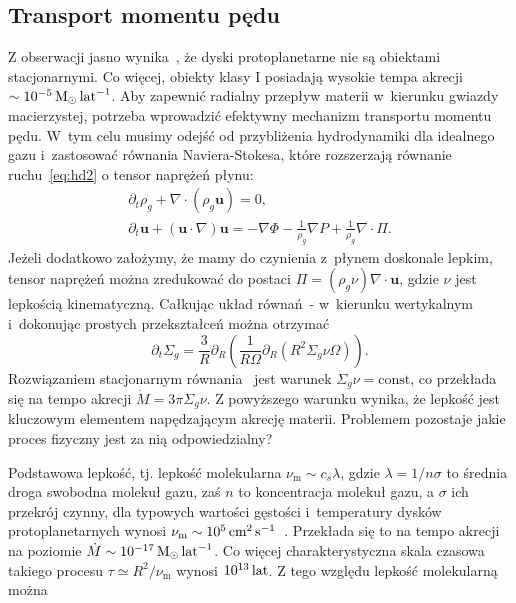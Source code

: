 \subsection{Transport momentu pędu}
Z obserwacji jasno wynika~\citep{MME04}, że dyski
protoplanetarne nie są obiektami stacjonarnymi. Co więcej, obiekty klasy I
posiadają wysokie tempa akrecji $\sim 10^{-5}\hbox{$\mathrm{\thinspace M_{\odot}}$}\hbox{$\thinspace\textrm{lat}$}^{-1}$. Aby zapewnić
radialny przepływ materii w~kierunku gwiazdy macierzystej, potrzeba wprowadzić
efektywny mechanizm transportu momentu pędu. W~tym celu musimy odejść od
przybliżenia hydrodynamiki dla idealnego gazu i~zastosować równania
Naviera-Stokesa, które rozszerzają równanie ruchu~\ref{eq:hd2} o tensor naprężeń
płynu:
%
\begin{gather}
   \partial_t \rho_g + \nabla\cdot\left(\rho_g\mathbf{u}\right) = 0,
   \label{eq:ns1}\\
\partial_t \mathbf{u} + \left(\mathbf{u}\cdot\nabla\right)\mathbf{u} = 
-\nabla\Phi -\frac{1}{\rho_g} \nabla P + \frac{1}{\rho_g} \nabla \cdot \Pi.
\label{eq:ns2}
\end{gather}
%
Jeżeli dodatkowo założymy, że mamy do czynienia z~płynem doskonale lepkim, tensor
naprężeń można zredukować do postaci $\Pi = (\rho_g \nu)\nabla\cdot\mathbf{u}$,
gdzie $\nu$ jest lepkością kinematyczną. Całkując układ
równań~- w~kierunku wertykalnym i~dokonując prostych
przekształceń można otrzymać
\begin{equation}\label{eq:sigma}
   \partial_t \Sigma_g =
   \frac{3}{R}\partial_R\left(\frac{1}{R\Omega}\partial_R\left(R^2\Sigma_g \nu
         \Omega\right)\right).
\end{equation}
Rozwiązaniem stacjonarnym równania~ jest warunek $\Sigma_g\nu =
\textrm{const}$, co przekłada się na tempo akrecji $\dot{M} = 3\pi\Sigma_g\nu$.
Z powyższego warunku wynika, że lepkość jest kluczowym elementem napędzającym
akrecję materii. Problemem pozostaje jakie proces fizyczny jest za nią
odpowiedzialny?
\par Podstawowa lepkość, tj. lepkość molekularna $\nu_{\textrm{m}} \sim c_s
\lambda$, gdzie $\lambda = 1 / n\sigma$ to średnia droga swobodna molekuł gazu,
zaś $n$ to koncentracja molekuł gazu, a $\sigma$ ich przekrój czynny, dla
typowych wartości gęstości i~temperatury dysków protoplanetarnych wynosi
$\nu_{\textrm{m}}\sim10^5\hbox{$\thinspace\textrm{cm}$}^2\hbox{$\thinspace\textrm{s}$}^{-1}$~\cite{armitage}. Przekłada się to na
tempo akrecji na poziomie $\dot{M}\sim 10^{-17}\hbox{$\mathrm{\thinspace M_{\odot}}$}\hbox{$\thinspace\textrm{lat}$}^{-1}$. Co więcej
charakterystyczna skala czasowa takiego procesu $\tau \simeq R^2 /
\nu_{\textrm{m}}$ wynosi $10^{13}\hbox{$\thinspace\textrm{lat}$}$. Z tego względu lepkość molekularną można
